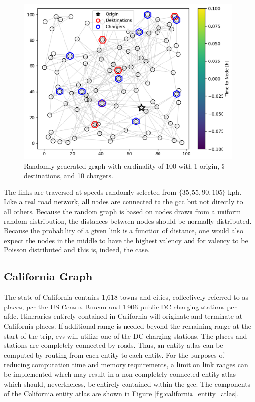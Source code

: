 \begin{figure}[H]
	\centering
	\includegraphics[width = \linewidth * 2 / 3]{figs/random_graph.png}
	\caption{Randomly generated graph with cardinality of 100 with 1 origin, 5 destinations, and 10 chargers.}
	\label{fig:random_graph}
\end{figure}

The links are traversed at speeds randomly selected from $\{35, 55, 90, 105\}$ kph. Like a real road network, all nodes are connected to the \gls{gcc} but not directly to all others. Because the random graph is based on nodes drawn from a uniform random distribution, the distances between nodes should be normally distributed. Because the probability of a given link is a function of distance, one would also expect the nodes in the middle to have the highest valency and for valency to be Poisson distributed and this is, indeed, the case.

\subsection*{California Graph}

The state of California contains 1,618 towns and cities, collectively referred to as places, per the US Census Bureau and 1,906 public DC charging stations per \gls{afdc}. Itineraries entirely contained in California will originate and terminate at California places. If additional range is needed beyond the remaining range at the start of the trip, \glspl{ev} will utilize one of the DC charging stations. The places and stations are completely connected by roads. Thus, an entity atlas can be computed by routing from each entity to each entity. For the purposes of reducing computation time and memory requirements, a limit on link ranges can be implemented which may result in a non-completely-connected entity atlas which should, nevertheless, be entirely contained within the \gls{gcc}. The components of the California entity atlas are shown in Figure \ref{fig:california_entity_atlas}.

